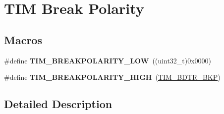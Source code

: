 \hypertarget{group___t_i_m___break___polarity}{}\section{T\+IM Break Polarity}
\label{group___t_i_m___break___polarity}
\subsection*{Macros}
\begin{DoxyCompactItemize}
\item 
\#define {\bfseries T\+I\+M\+\_\+\+B\+R\+E\+A\+K\+P\+O\+L\+A\+R\+I\+T\+Y\+\_\+\+L\+OW}~((uint32\+\_\+t)0x0000)\hypertarget{group___t_i_m___break___polarity_ga3e07cb0376c1bf561341dc8befb66208}{}\label{group___t_i_m___break___polarity_ga3e07cb0376c1bf561341dc8befb66208}

\item 
\#define {\bfseries T\+I\+M\+\_\+\+B\+R\+E\+A\+K\+P\+O\+L\+A\+R\+I\+T\+Y\+\_\+\+H\+I\+GH}~(\hyperlink{group___peripheral___registers___bits___definition_ga3247abbbf0d00260be051d176d88020e}{T\+I\+M\+\_\+\+B\+D\+T\+R\+\_\+\+B\+KP})\hypertarget{group___t_i_m___break___polarity_ga97c30f1134accd61e3e42ce37e472700}{}\label{group___t_i_m___break___polarity_ga97c30f1134accd61e3e42ce37e472700}

\end{DoxyCompactItemize}


\subsection{Detailed Description}
